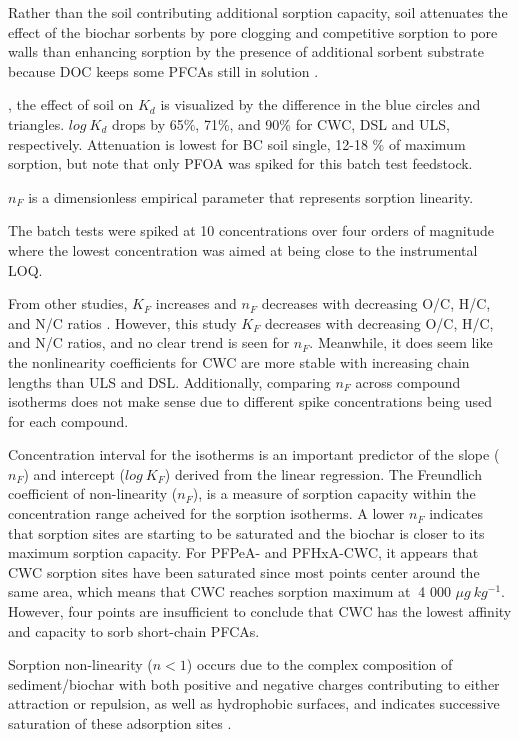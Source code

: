 Rather than the soil contributing additional sorption capacity, soil attenuates the effect of the biochar sorbents by pore clogging and competitive sorption to pore walls than enhancing sorption by the presence of additional sorbent substrate because DOC keeps some PFCAs still in solution \citep{Li2019}.
 
, the effect of soil on $K_d$ is visualized by the difference in the blue circles and triangles. $log~K_d$ drops by 65\%, 71\%, and 90\% for CWC, DSL and ULS, respectively. Attenuation is lowest for BC soil single, 12-18 \% of maximum sorption, but note that only PFOA was spiked for this batch test feedstock.
  
$n_F$ is a dimensionless empirical parameter that represents sorption linearity.

The batch tests were spiked at 10 concentrations over four orders of magnitude where the lowest concentration was aimed at being close to the instrumental LOQ. 

From other studies, $K_F$ increases and $n_F$ decreases with decreasing O/C, H/C, and N/C ratios \citep{Cornelissen2005}. However, this study $K_F$ decreases with decreasing O/C, H/C, and N/C ratios, and no clear trend is seen for $n_F$. Meanwhile, it does seem like the nonlinearity coefficients for CWC are more stable with increasing chain lengths than ULS and DSL. Additionally, comparing $n_F$ across compound isotherms does not make sense due to different spike concentrations being used for each compound.

Concentration interval for the isotherms is an important predictor of the slope ($n_F$) and intercept ($log~K_F$) derived from the linear regression.  The Freundlich coefficient of non-linearity ($n_F$), is a measure of sorption capacity within the concentration range acheived for the sorption isotherms. A lower $n_F$ indicates that sorption sites are starting to be saturated and the biochar is closer to its maximum sorption capacity.  For PFPeA- and PFHxA-CWC, it appears that CWC sorption sites have been saturated since most points center around the same area, which means that CWC reaches sorption maximum at $~$4 000 $\mu g~kg^{-1}$. However, four points are insufficient to conclude that CWC has the lowest affinity and capacity to sorb short-chain PFCAs. 

Sorption non-linearity ($n<1$) occurs due to the complex composition of sediment/biochar with both positive and negative charges contributing to either attraction or repulsion, as well as hydrophobic surfaces, and indicates successive saturation of these adsorption sites \citep{yin2022insights}. 

